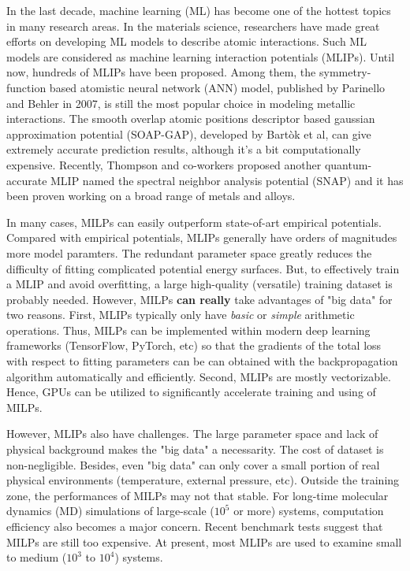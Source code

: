 \documentclass[prb,reprint]{revtex4-2}
\begin{document}
In the last decade, machine learning (ML) has become one of the hottest 
topics in many research areas. In the materials science, researchers have made 
great efforts on developing ML models to describe atomic interactions. Such ML 
models are considered as machine learning interaction potentials (MLIPs). Until 
now, hundreds of MLIPs have been proposed. Among them, the symmetry-function 
based atomistic neural network (ANN) model, published by Parinello and Behler in 
2007, is still the most popular choice in modeling metallic interactions. 
The smooth overlap atomic positions descriptor based gaussian approximation 
potential (SOAP-GAP), developed by Bartòk et al, can give extremely accurate 
prediction results, although it's a bit computationally expensive. 
Recently, Thompson and co-workers proposed another quantum-accurate MLIP named 
the spectral neighbor analysis potential (SNAP) and it has been proven working  
on a broad range of metals and alloys. 

In many cases, MILPs can easily outperform state-of-art empirical potentials. 
Compared with empirical potentials, MLIPs generally have orders of magnitudes 
more model paramters. The redundant parameter space greatly reduces the 
difficulty of fitting complicated potential energy surfaces. But, to effectively 
train a MLIP and avoid overfitting, a large high-quality (versatile) training 
dataset is probably needed. However, MILPs \textbf{can really} take advantages 
of "big data" for two reasons. First, MLIPs typically only have 
\textit{basic} or \textit{simple} arithmetic operations. Thus, MILPs can be 
implemented within modern deep learning frameworks (TensorFlow, PyTorch, etc) 
so that the gradients of the total loss with respect to fitting parameters can 
be can obtained with the backpropagation algorithm automatically and 
efficiently. Second, MLIPs are mostly vectorizable. Hence, GPUs can be utilized
to significantly accelerate training and using of MILPs.

However, MLIPs also have challenges. The large parameter space and lack of 
physical background makes the "big data" a necessarity. The cost of dataset is 
non-negligible. Besides, even "big data" can only cover a small portion of real 
physical environments (temperature, external pressure, etc). Outside the 
training zone, the performances of MILPs may not that stable. For long-time 
molecular dynamics (MD) simulations of large-scale ($10^5$ or more) systems, 
computation efficiency also becomes a major concern. Recent benchmark tests 
suggest that MILPs are still too expensive. At present, most MLIPs are used to 
examine small to medium ($10^3$ to $10^4$) systems.
\end{document}
